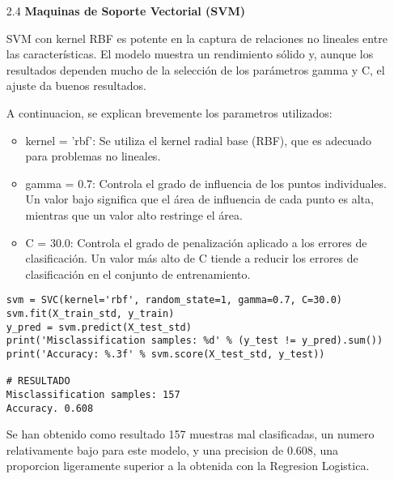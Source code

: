 \documentclass{article}
\begin{document}
\bigskip

\begin{itemize}

\item[2.4]  {\bf Maquinas de Soporte Vectorial (SVM)}

SVM con kernel RBF es potente en la captura de relaciones no lineales entre las características. El modelo muestra un rendimiento sólido y, aunque los resultados dependen mucho de la selección de los parámetros gamma y C, el ajuste da buenos resultados.

A continuacion, se explican brevemente los parametros utilizados:

\begin{itemize}

\item
kernel = 'rbf': Se utiliza el kernel radial base (RBF), que es adecuado para problemas no lineales.

\item
gamma = 0.7: Controla el grado de influencia de los puntos individuales. Un valor bajo significa que el área de influencia de cada punto es alta, mientras que un valor alto restringe el área.

\item
C = 30.0: Controla el grado de penalización aplicado a los errores de clasificación. Un valor más alto de C tiende a reducir los errores de clasificación en el conjunto de entrenamiento.

\end{itemize}

\begin{tcolorbox}[width=14cm]
\begin{scriptsize}
\begin{verbatim}
svm = SVC(kernel='rbf', random_state=1, gamma=0.7, C=30.0)
svm.fit(X_train_std, y_train)
y_pred = svm.predict(X_test_std)
print('Misclassification samples: %d' % (y_test != y_pred).sum())
print('Accuracy: %.3f' % svm.score(X_test_std, y_test))

# RESULTADO
Misclassification samples: 157
Accuracy. 0.608
\end{verbatim}
\end{scriptsize}
\end{tcolorbox}

Se han obtenido como resultado 157 muestras mal clasificadas, un numero relativamente bajo para este modelo, y una precision de 0.608, una proporcion ligeramente superior a la obtenida con la Regresion Logistica.

\end{itemize}
\end{document}

